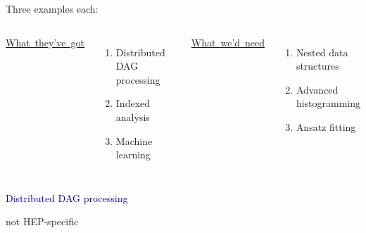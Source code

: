 \documentclass[aspectratio=169]{beamer}
\begin{document}
\begin{frame}{Three examples each:}
\Large
\vspace{0.5 cm}
\begin{columns}[t]
\mbox{\hspace{0.25 cm}\underline{What they've got}}

\vspace{0.25 cm}
\begin{enumerate}
\item Distributed DAG processing
\item Indexed analysis
\item Machine learning
\end{enumerate}

\mbox{\hspace{0.45 cm}\underline{What we'd need}}

\vspace{0.25 cm}
\begin{enumerate}
\item Nested data structures
\item Advanced histogramming
\item Ansatz fitting
\end{enumerate}

\end{columns}
\end{frame}

\begin{frame}{}
\huge
\vspace{0.5 cm}
\begin{center}
\textcolor{darkblue}{Distributed DAG processing}

\large
\vspace{0.5 cm}
not HEP-specific
\end{center}
\end{frame}
\end{document}

